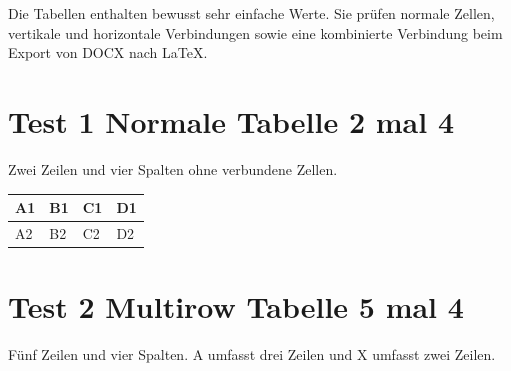 Die Tabellen enthalten bewusst sehr einfache Werte. Sie prüfen normale Zellen, vertikale und horizontale Verbindungen sowie eine kombinierte Verbindung beim Export von DOCX nach LaTeX.

\section{Test 1 Normale Tabelle 2 mal 4}\label{test-1-normale-tabelle-2-mal-4}

Zwei Zeilen und vier Spalten ohne verbundene Zellen.

{\def\LTcaptype{none} %
\begin{longtable}[]{@{}
  >{\centering\arraybackslash}p{}
  >{\raggedright\arraybackslash}p{}
  >{\raggedright\arraybackslash}p{}
  >{\raggedright\arraybackslash}p{}@{}}
\toprule\noalign{}
\begin{minipage}[b]{\linewidth}\centering
A1
\end{minipage} & \begin{minipage}[b]{\linewidth}\centering
B1
\end{minipage} & \begin{minipage}[b]{\linewidth}\centering
C1
\end{minipage} & \begin{minipage}[b]{\linewidth}\centering
D1
\end{minipage} \\
\midrule\noalign{}
\endhead
\bottomrule\noalign{}
\endlastfoot
A2 & B2 & C2 & D2 \\
\end{longtable}
}

\section{Test 2 Multirow Tabelle 5 mal 4}\label{test-2-multirow-tabelle-5-mal-4}

Fünf Zeilen und vier Spalten. A umfasst drei Zeilen und X umfasst zwei Zeilen.

